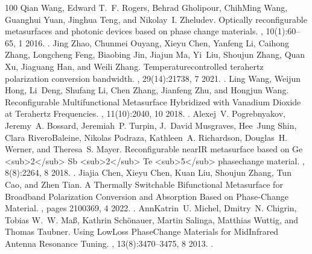 \documentclass[a4paper,10pt,english,openany,oneside]{jupyterBook}
\begin{document}
\begin{sphinxthebibliography}{100}
\sphinxAtStartPar
Qian Wang, Edward T. F. Rogers, Behrad Gholipour, Chih\sphinxhyphen{}Ming Wang, Guanghui Yuan, Jinghua Teng, and Nikolay I. Zheludev. Optically reconfigurable metasurfaces and photonic devices based on phase change materials. , 10(1):60–65, 1 2016. .
\sphinxAtStartPar
Jing Zhao, Chunmei Ouyang, Xieyu Chen, Yanfeng Li, Caihong Zhang, Longcheng Feng, Biaobing Jin, Jiajun Ma, Yi Liu, Shoujun Zhang, Quan Xu, Jiaguang Han, and Weili Zhang. Temperature\sphinxhyphen{}controlled terahertz polarization conversion bandwidth. , 29(14):21738, 7 2021. .
\sphinxAtStartPar
Ling Wang, Weijun Hong, Li Deng, Shufang Li, Chen Zhang, Jianfeng Zhu, and Hongjun Wang. Reconfigurable Multifunctional Metasurface Hybridized with Vanadium Dioxide at Terahertz Frequencies. , 11(10):2040, 10 2018. .
\sphinxAtStartPar
Alexej V. Pogrebnyakov, Jeremy A. Bossard, Jeremiah P. Turpin, J. David Musgraves, Hee Jung Shin, Clara Rivero\sphinxhyphen{}Baleine, Nikolas Podraza, Kathleen A. Richardson, Douglas H. Werner, and Theresa S. Mayer. Reconfigurable near\sphinxhyphen{}IR metasurface based on Ge <sub>2</sub> Sb <sub>2</sub> Te <sub>5</sub> phase\sphinxhyphen{}change material. , 8(8):2264, 8 2018. .
\sphinxAtStartPar
Jiajia Chen, Xieyu Chen, Kuan Liu, Shoujun Zhang, Tun Cao, and Zhen Tian. A Thermally Switchable Bifunctional Metasurface for Broadband Polarization Conversion and Absorption Based on Phase‐Change Material. , pages 2100369, 4 2022. .
\sphinxAtStartPar
Ann\sphinxhyphen{}Katrin U. Michel, Dmitry N. Chigrin, Tobias W. W. Maß, Kathrin Schönauer, Martin Salinga, Matthias Wuttig, and Thomas Taubner. Using Low\sphinxhyphen{}Loss Phase\sphinxhyphen{}Change Materials for Mid\sphinxhyphen{}Infrared Antenna Resonance Tuning. , 13(8):3470–3475, 8 2013. .

\end{sphinxthebibliography}
\end{document}
